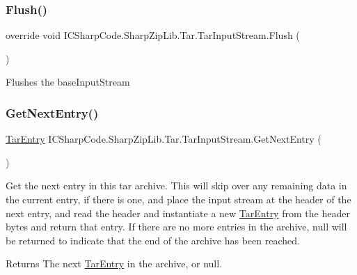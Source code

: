 \subsubsection{\texorpdfstring{Flush()}{Flush()}}
{\footnotesize\ttfamily override void I\+C\+Sharp\+Code.\+Sharp\+Zip\+Lib.\+Tar.\+Tar\+Input\+Stream.\+Flush (\begin{DoxyParamCaption}{ }\end{DoxyParamCaption})\hspace{0.3cm}{\ttfamily [inline]}}



Flushes the base\+Input\+Stream 

\mbox{\label{class_i_c_sharp_code_1_1_sharp_zip_lib_1_1_tar_1_1_tar_input_stream_ad1c9380146d8de1f637e7a41868b765d}} 
\subsubsection{\texorpdfstring{Get\+Next\+Entry()}{GetNextEntry()}}
{\footnotesize\ttfamily \hyperlink{class_i_c_sharp_code_1_1_sharp_zip_lib_1_1_tar_1_1_tar_entry}{Tar\+Entry} I\+C\+Sharp\+Code.\+Sharp\+Zip\+Lib.\+Tar.\+Tar\+Input\+Stream.\+Get\+Next\+Entry (\begin{DoxyParamCaption}{ }\end{DoxyParamCaption})\hspace{0.3cm}{\ttfamily [inline]}}



Get the next entry in this tar archive. This will skip over any remaining data in the current entry, if there is one, and place the input stream at the header of the next entry, and read the header and instantiate a new \hyperlink{class_i_c_sharp_code_1_1_sharp_zip_lib_1_1_tar_1_1_tar_entry}{Tar\+Entry} from the header bytes and return that entry. If there are no more entries in the archive, null will be returned to indicate that the end of the archive has been reached. 

\begin{DoxyReturn}{Returns}
The next \hyperlink{class_i_c_sharp_code_1_1_sharp_zip_lib_1_1_tar_1_1_tar_entry}{Tar\+Entry} in the archive, or null. 
\end{DoxyReturn}
\mbox{\label{class_i_c_sharp_code_1_1_sharp_zip_lib_1_1_tar_1_1_tar_input_stream_af1b1981acd96ff1e46b278a68a89ea80}} 
